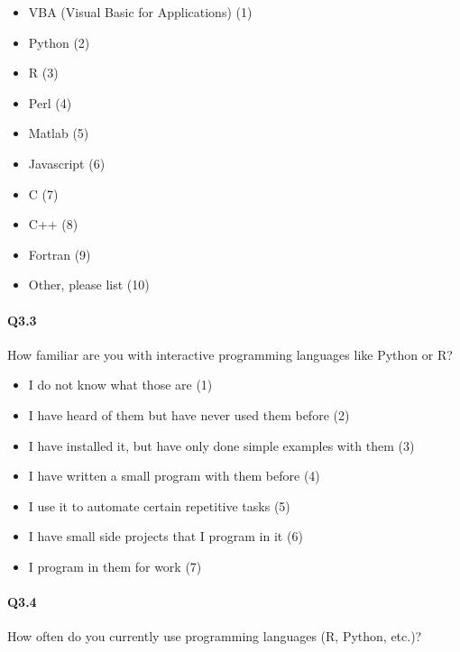 \documentclass[020-persona\_validation.tex]{subfiles}
\begin{document}
            \begin{itemize}
                \item VBA (Visual Basic for Applications)  (1)
                \item Python  (2)
                \item R  (3)
                \item Perl  (4)
                \item Matlab  (5)
                \item Javascript  (6)
                \item C  (7)
                \item C++  (8)
                \item Fortran  (9)
                \item Other, please list  (10)
            \end{itemize}

        \paragraph{Q3.3}

            How familiar are you with interactive programming languages like Python or R?

            \begin{itemize}
                \item I do not know what those are  (1)
                \item I have heard of them but have never used them before  (2)
                \item I have installed it, but have only done simple examples with them  (3)
                \item I have written a small program with them before  (4)
                \item I use it to automate certain repetitive tasks  (5)
                \item I have small side projects that I program in it  (6)
                \item I program in them for work  (7)
            \end{itemize}

        \paragraph{Q3.4}

            How often do you currently use programming languages (R, Python, etc.)?
\end{document}
